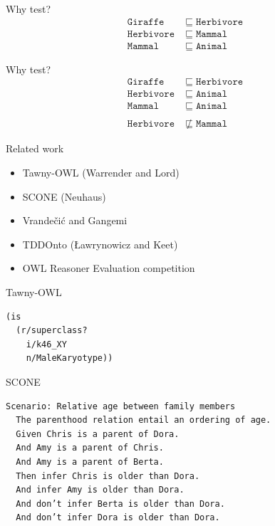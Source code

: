\documentclass[17pt,mathserif]{beamer}
\newcommand{\oclass}[1]{\ensuremath{\mathtt{#1}}}
\newcommand{\osub}{\sqsubseteq}
\newcommand{\onsub}{\not\sqsubseteq}
\begin{document}
\begin{frame}[t]{Why test?}
  \begin{align*}
    \oclass{Giraffe} &\osub \oclass{Herbivore} \\
    \oclass{Herbivore} &\osub \oclass{Mammal} \\
    \oclass{Mammal} &\osub \oclass{Animal}
  \end{align*}
\end{frame}

\begin{frame}[t]{Why test?}
  \begin{align*}
    \oclass{Giraffe} &\osub \oclass{Herbivore} \\
    \oclass{Herbivore} &\osub \oclass{Animal} \\
    \oclass{Mammal} &\osub \oclass{Animal} \\
    \\
    \oclass{Herbivore} &\onsub \oclass{Mammal}
  \end{align*}
\end{frame}

\begin{frame}{Related work}
  \begin{itemize}
    \item Tawny-OWL (Warrender and Lord)
    \item SCONE (Neuhaus)
    \item Vrande\v{c}i\'c and Gangemi
    \item TDDOnto ({\L}awrynowicz and Keet)
    \item OWL Reasoner Evaluation competition
  \end{itemize}
\end{frame}

\begin{frame}[fragile]{Tawny-OWL}
  \begin{lstlisting}[language=Lisp,basicstyle=\normalsize\ttfamily]
(is
  (r/superclass?
    i/k46_XY
    n/MaleKaryotype))
  \end{lstlisting}
\end{frame}

\begin{frame}[fragile]{SCONE}
  \begin{lstlisting}[basicstyle=\footnotesize\ttfamily]
Scenario: Relative age between family members
  The parenthood relation entail an ordering of age.
  Given Chris is a parent of Dora.
  And Amy is a parent of Chris.
  And Amy is a parent of Berta.
  Then infer Chris is older than Dora.
  And infer Amy is older than Dora.
  And don’t infer Berta is older than Dora.
  And don’t infer Dora is older than Dora.
  \end{lstlisting}
\end{frame}
\end{document}
